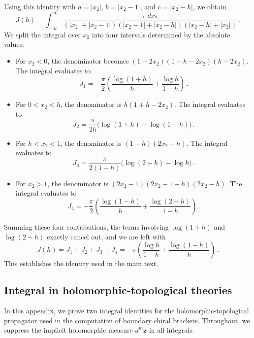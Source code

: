 \documentclass[11pt]{article}
\numberwithin{equation}{section}
\begin{document}
Using this identity with $a=|x_2|$, $b=|x_2-1|$, and $c=|x_2-h|$, we obtain
\begin{equation}
J(h) = \int_{-\infty}^\infty \frac{\pi\,dx_2}{(|x_2|+|x_2-1|)(|x_2-1|+|x_2-h|)(|x_2-h|+|x_2|)}\,.
\end{equation}
We split the integral over $x_2$ into four intervals determined by the absolute values:
\begin{itemize}
\item For $x_2 < 0$, the denominator becomes $(1-2x_2)(1+h-2x_2)(h-2x_2)$. The integral evaluates to
\begin{equation*}
    J_1 = -\frac{\pi}{2} \left(\frac{\log(1+h)}{h} + \frac{\log h}{1-h}\right)\,.
\end{equation*}
\item For $0 < x_2 < h$, the denominator is $h(1+h-2x_2)$. The integral evaluates to
\begin{equation*}
    J_2 = \frac{\pi}{2h} \bigl(\log(1+h) - \log(1-h)\bigr)\,.
\end{equation*}
\item For $h < x_2 < 1$, the denominator is $(1-h)(2x_2-h)$. The integral evaluates to
\begin{equation*}
    J_3 = \frac{\pi}{2(1-h)} \bigl(\log(2-h) - \log h\bigr)\,.
\end{equation*}
\item For $x_2 > 1$, the denominator is $(2x_2-1)(2x_2-1-h)(2x_2-h)$. The integral evaluates to
\begin{equation*}
    J_4 = -\frac{\pi}{2} \left(\frac{\log(1-h)}{h} + \frac{\log(2-h)}{1-h}\right)\,.
\end{equation*}
\end{itemize}
Summing these four contributions, the terms involving $\log(1+h)$ and $\log(2-h)$ exactly cancel out, and we are left with
\begin{equation}
J(h) = J_1 + J_2 + J_3 + J_4 = -\pi \left( \frac{\log h}{1-h} + \frac{\log(1-h)}{h} \right)\,.
\end{equation}
This establishes the identity used in the main text.

\subsection{Integral in holomorphic-topological theories}
\label{sec:bdy_identity}
In this appendix, we prove two integral identities for the holomorphic-topological propagator used in the computation of boundary chiral brackets. Throughout, we suppress the implicit holomorphic measure $d^m\boldsymbol{z}$ in all integrals.
\end{document}
